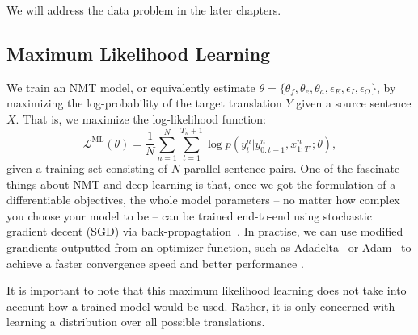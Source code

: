 We will address the data problem in the later chapters.

\subsection{Maximum Likelihood Learning}
\label{cp2.sec.mle}
We train an NMT model, or equivalently estimate $\theta =\{\theta_f, \theta_e, \theta_a, \epsilon_E, \epsilon_I, \epsilon_O \}$, by maximizing the log-probability of the target translation $Y$ given a source sentence $X$. That is, we maximize the log-likelihood function:
\begin{equation}
	\label{cp2.eq.learning}
    \mathcal{L}^{\text{ML}}(\theta)  = \frac{1}{N} \sum_{n=1}^N \sum_{t=1}^{T_n+1} \log p(y_t^n| y_{0:t-1}^n, x_{1:T'}^n; \theta),
\end{equation}
given a training set consisting of $N$ parallel sentence pairs. One of the fascinate things about NMT and deep learning is that, once we got the formulation of a differentiable objectives, the whole model parameters -- no matter how complex you choose your model to be -- can be trained end-to-end using stochastic gradient decent (SGD) via back-propagtation~\cite{rumelhart1986learning}. In practise, we can use modified grandients outputted from an optimizer function, such as Adadelta~\cite{zeiler2012adadelta} or Adam~\cite{kingma2014adam} to achieve a faster convergence speed and better performance .

It is important to note that this maximum likelihood learning does not take into account how a trained model would be used. Rather, it is only concerned with learning a distribution over all possible translations. 



